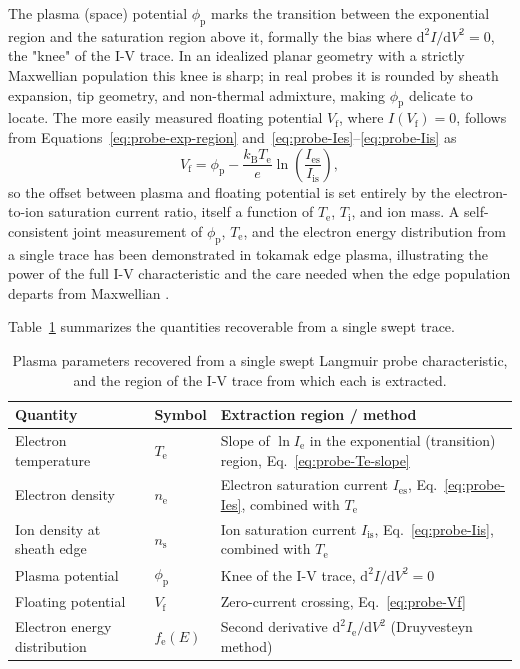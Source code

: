 The plasma (space) potential $\phi_{\mathrm{p}}$ marks the transition between the exponential region and the saturation region above it, formally the bias where $\mathrm{d}^2 I / \mathrm{d}V^2 = 0$, the "knee" of the I-V trace. In an idealized planar geometry with a strictly Maxwellian population this knee is sharp; in real probes it is rounded by sheath expansion, tip geometry, and non-thermal admixture, making $\phi_{\mathrm{p}}$ delicate to locate. The more easily measured floating potential $V_{\mathrm{f}}$, where $I(V_{\mathrm{f}}) = 0$, follows from Equations~\eqref{eq:probe-exp-region} and~\eqref{eq:probe-Ies}--\eqref{eq:probe-Iis} as
\begin{equation}
V_{\mathrm{f}} = \phi_{\mathrm{p}} - \frac{k_{\mathrm{B}} T_{\mathrm{e}}}{e} \ln\!\left(\frac{I_{\mathrm{es}}}{I_{\mathrm{is}}}\right),
\label{eq:probe-Vf}
\end{equation}
so the offset between plasma and floating potential is set entirely by the electron-to-ion saturation current ratio, itself a function of $T_{\mathrm{e}}$, $T_{\mathrm{i}}$, and ion mass. A self-consistent joint measurement of $\phi_{\mathrm{p}}$, $T_{\mathrm{e}}$, and the electron energy distribution from a single trace has been demonstrated in tokamak edge plasma, illustrating the power of the full I-V characteristic and the care needed when the edge population departs from Maxwellian \cite{ref0213}.

Table~\ref{tab:probe-quantities} summarizes the quantities recoverable from a single swept trace.

\begin{table}[htbp]
\centering
\caption{Plasma parameters recovered from a single swept Langmuir probe characteristic, and the region of the I-V trace from which each is extracted.}
\label{tab:probe-quantities}
\begin{tabularx}{\textwidth}{@{}l l X@{}}
\toprule
Quantity & Symbol & Extraction region / method \\
\midrule
Electron temperature & $T_{\mathrm{e}}$ & Slope of $\ln I_{\mathrm{e}}$ in the exponential (transition) region, Eq.~\eqref{eq:probe-Te-slope} \\
Electron density & $n_{\mathrm{e}}$ & Electron saturation current $I_{\mathrm{es}}$, Eq.~\eqref{eq:probe-Ies}, combined with $T_{\mathrm{e}}$ \\
Ion density at sheath edge & $n_{\mathrm{s}}$ & Ion saturation current $I_{\mathrm{is}}$, Eq.~\eqref{eq:probe-Iis}, combined with $T_{\mathrm{e}}$ \\
Plasma potential & $\phi_{\mathrm{p}}$ & Knee of the I-V trace, $\mathrm{d}^2 I/\mathrm{d}V^2 = 0$ \\
Floating potential & $V_{\mathrm{f}}$ & Zero-current crossing, Eq.~\eqref{eq:probe-Vf} \\
Electron energy distribution & $f_{\mathrm{e}}(E)$ & Second derivative $\mathrm{d}^2 I_{\mathrm{e}}/\mathrm{d}V^2$ (Druyvesteyn method) \\
\bottomrule
\end{tabularx}
\end{table}

